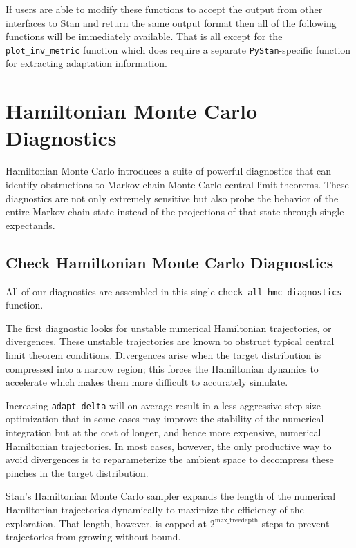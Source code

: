 \documentclass[
  letterpaper,
  DIV=11,
  numbers=noendperiod]{scrartcl}
\begin{document}
If users are able to modify these functions to accept the output from
other interfaces to Stan and return the same output format then all of
the following functions will be immediately available. That is all
except for the \texttt{plot\_inv\_metric} function which does require a
separate \texttt{PyStan}-specific function for extracting adaptation
information.

\hypertarget{hamiltonian-monte-carlo-diagnostics}{%
\section{Hamiltonian Monte Carlo
Diagnostics}\label{hamiltonian-monte-carlo-diagnostics}}

Hamiltonian Monte Carlo introduces a suite of powerful diagnostics that
can identify obstructions to Markov chain Monte Carlo central limit
theorems. These diagnostics are not only extremely sensitive but also
probe the behavior of the entire Markov chain state instead of the
projections of that state through single expectands.

\hypertarget{check-hamiltonian-monte-carlo-diagnostics}{%
\subsection{Check Hamiltonian Monte Carlo
Diagnostics}\label{check-hamiltonian-monte-carlo-diagnostics}}

All of our diagnostics are assembled in this single
\texttt{check\_all\_hmc\_diagnostics} function.

The first diagnostic looks for unstable numerical Hamiltonian
trajectories, or divergences. These unstable trajectories are known to
obstruct typical central limit theorem conditions. Divergences arise
when the target distribution is compressed into a narrow region; this
forces the Hamiltonian dynamics to accelerate which makes them more
difficult to accurately simulate.

Increasing \texttt{adapt\_delta} will on average result in a less
aggressive step size optimization that in some cases may improve the
stability of the numerical integration but at the cost of longer, and
hence more expensive, numerical Hamiltonian trajectories. In most cases,
however, the only productive way to avoid divergences is to
reparameterize the ambient space to decompress these pinches in the
target distribution.

Stan's Hamiltonian Monte Carlo sampler expands the length of the
numerical Hamiltonian trajectories dynamically to maximize the
efficiency of the exploration. That length, however, is capped at
\(2^{\text{max\_treedepth}}\) steps to prevent trajectories from growing
without bound.
\end{document}
